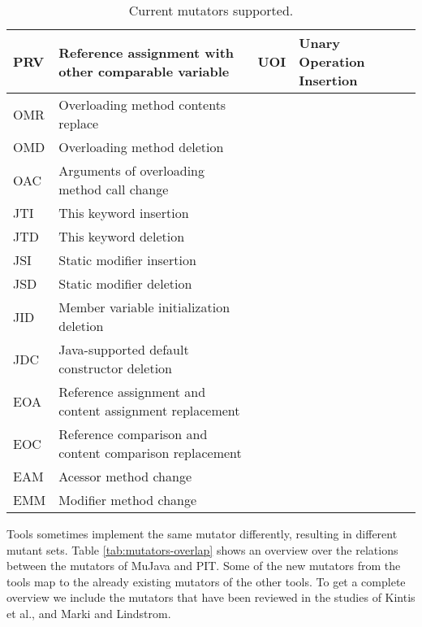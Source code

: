 \documentclass[../main]{subfiles}
\begin{document}
\begin{table}[htb]
\begin{tabular}{|l|l|l|l|}
PRV & Reference assignment   with other comparable variable     & UOI                   & Unary Operation Insertion       \\ \hline
OMR & Overloading method   contents replace                     & \multicolumn{1}{l|}{} &                                 \\ \hline
OMD & Overloading method   deletion                             & \multicolumn{1}{l|}{} &                                 \\ \hline
OAC & Arguments of   overloading method call change             & \multicolumn{1}{l|}{} &                                 \\ \hline
JTI & This keyword insertion                                    & \multicolumn{1}{l|}{} &                                 \\ \hline
JTD & This keyword deletion                                     & \multicolumn{1}{l|}{} &                                 \\ \hline
JSI & Static modifier   insertion                               & \multicolumn{1}{l|}{} &                                 \\ \hline
JSD & Static modifier   deletion                                & \multicolumn{1}{l|}{} &                                 \\ \hline
JID & Member variable   initialization deletion                 & \multicolumn{1}{l|}{} &                                 \\ \hline
JDC & Java-supported default   constructor deletion             & \multicolumn{1}{l|}{} &                                 \\ \hline
EOA & Reference assignment   and content assignment replacement & \multicolumn{1}{l|}{} &                                 \\ \hline
EOC & Reference comparison   and content comparison replacement & \multicolumn{1}{l|}{} &                                 \\ \hline
EAM & Acessor method change                                     & \multicolumn{1}{l|}{} &                                 \\ \hline
EMM & Modifier method change                                    & \multicolumn{1}{l|}{} &                                 \\ \hline
\end{tabular}
\caption{\label{tab:mutators-current}Current mutators supported.}
\end{table}
\newpage
Tools sometimes implement the same mutator differently, resulting in different mutant sets. Table \ref{tab:mutators-overlap} shows an overview over the relations between the mutators of MuJava and PIT. 
Some of the new mutators from the tools map to the already existing mutators of the other tools.
To get a complete overview we include the mutators that have been reviewed in the studies of Kintis et al., and Marki and Lindstrom. 
\end{document}
